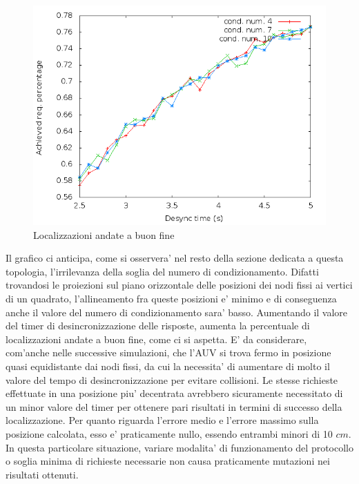 \begin{figure}[H]
    \centering
    \includegraphics[scale=0.5]{squaresimulation/achievedlocpreempt0drop0speed0.png}
    \caption{Localizzazioni andate a buon fine}
    \label{fig:squaresimulation/achievedlocpreempt0drop0speed0}
\end{figure}

Il grafico ci anticipa, come si osservera' nel resto della sezione dedicata a questa topologia, l'irrilevanza della soglia del numero di condizionamento. Difatti trovandosi le proiezioni sul piano orizzontale delle posizioni dei nodi fissi ai vertici di un quadrato, l'allineamento fra queste posizioni e' minimo e di conseguenza anche il valore del numero di condizionamento sara' basso. Aumentando il valore del timer di desincronizzazione delle risposte, aumenta la percentuale di localizzazioni andate a buon fine, come ci si aspetta. E' da considerare, com'anche nelle successive simulazioni, che l'AUV si trova fermo in posizione quasi equidistante dai nodi fissi, da cui la necessita' di aumentare di molto il valore del tempo di desincronizzazione per evitare collisioni. Le stesse richieste effettuate in una posizione piu' decentrata avrebbero sicuramente necessitato di un minor valore del timer per ottenere pari risultati in termini di successo della localizzazione.
Per quanto riguarda l'errore medio e l'errore massimo sulla posizione calcolata, esso e' praticamente nullo, essendo entrambi minori di 10 $cm$.
In questa particolare situazione, variare modalita' di funzionamento del protocollo o soglia minima di richieste necessarie non causa praticamente mutazioni nei risultati ottenuti.

